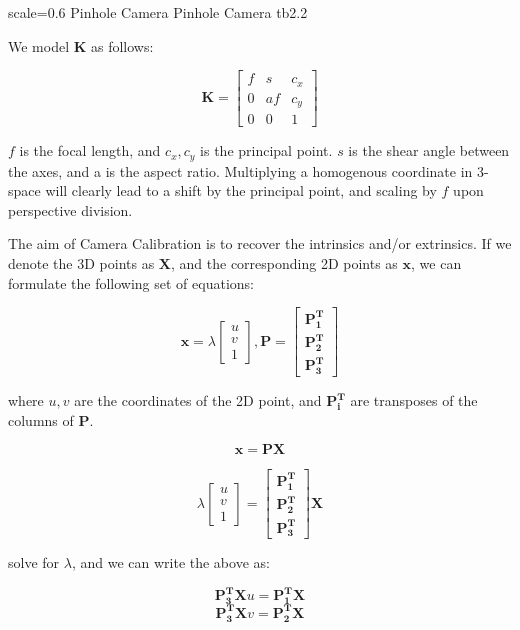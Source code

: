 {scale=0.6}%
{Pinhole Camera}%
{Pinhole Camera}%
{tb2.2}

We model \textbf{K} as follows:

\[\mathbf{K} = \begin{bmatrix}
f & s & c_x\\
0 & af & c_y\\
0 & 0 & 1
\end{bmatrix}\]

$f$ is the focal length, and $c_x, c_y$ is the principal point. $s$ is the shear angle between the axes, and a is the aspect ratio. Multiplying a homogenous coordinate in 3-space will clearly lead to a shift by the principal point, and scaling by $f$ upon perspective division. 

The aim of Camera Calibration is to recover the intrinsics and/or extrinsics. If we denote the 3D points as $\mathbf{X}$, and the corresponding 2D points as $\mathbf{x}$, we can formulate the following set of equations:

\[\mathbf{x}=\lambda\begin{bmatrix}
u\\
v\\
1\end{bmatrix}, \mathbf{P} = \begin{bmatrix}
\mathbf{P_1^T}\\
\mathbf{P_2^T}\\
\mathbf{P_3^T}\end{bmatrix} \]

where $u, v$ are the coordinates of the 2D point, and $\mathbf{P_i^T}$ are transposes of the columns of $\mathbf{P}$. 

\[\mathbf{x} = \mathbf{PX}\]

\[\lambda\begin{bmatrix}
u\\
v\\
1\end{bmatrix} = \begin{bmatrix}
\mathbf{P_1^T}\\
\mathbf{P_2^T}\\
\mathbf{P_3^T}\end{bmatrix}\mathbf{X}\]

solve for $\lambda$, and we can write the above as:

\[\mathbf{P_3^TX}u = \mathbf{P_1^TX}\]
\[\mathbf{P_3^TX}v = \mathbf{P_2^TX}\]

